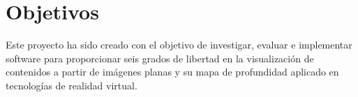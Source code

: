 
\pagestyle{empty}
\chapter {Objetivos}

Este proyecto ha sido creado con el objetivo de investigar, evaluar e implementar software para proporcionar seis grados de libertad en la visualización de contenidos a partir de imágenes planas y su mapa de profundidad aplicado en tecnologías de realidad virtual.